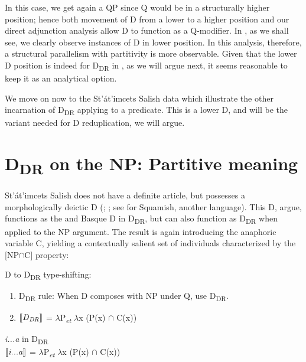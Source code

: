 \documentclass[output=paper,
modfonts
]{langscibook}
\begin{document}
In this case, we get again a QP since Q would be in a structurally higher position; hence both movement of D from a lower to a higher position and our direct adjunction analysis allow D to function as a Q-modifier. In , as we shall see, we clearly observe instances of D in lower position. In this analysis, therefore, a structural parallelism with partitivity is more observable. Given that the lower D position is indeed for D\textsubscript{DR} in , as we will argue next, it seems reasonable to keep it as an analytical option.   

We move on now to the St'\'at'imcets Salish data which illustrate the other incarnation of D\textsubscript{DR} applying to a predicate. This is a lower D, and will be the variant needed for  D reduplication, we will argue.

\section{D\textsubscript{DR} on the NP: Partitive meaning} \label{sec:etxeberria:3}

St'\'at'imcets Salish does not have a definite article, but possesses a morphologically deictic D (\citealt{matthewson1998}; \citeyear{matthewson2008}; see \citealt{gillon2006, gillon2009} for Squamish, another  language). This D, \citet{etxeberria-giannakidou2009, etxeberria-giannakidou2014} argue, functions as the  and Basque D in D\textsubscript{DR}, but can also function as D\textsubscript{DR} when applied to the NP argument. The result is again introducing the anaphoric variable C, yielding a contextually salient set of individuals characterized by the [NP$\cap$C] property:

\ea\label{ex:etxeberria:35}
	D to D\textsubscript{DR} type-shifting:
\begin{enumerate}
	\item D\textsubscript{DR} rule: When D composes with NP under Q, use D\textsubscript{DR}.
	\item $[\![\text{\textit{D}\textsubscript{\textit{DR}}}]\!]$ = $\lambda$P\textsubscript{\textit{et}} $\lambda$x (P(x) $\cap$ C(x))
\end{enumerate}
\z

\ea\label{ex:etxeberria:36}
	\textit{i...a} in D\textsubscript{DR}\\
	$[\![\text{\textit{i...a}}]\!]$ = $\lambda$P\textsubscript{\textit{et}} $\lambda$x (P(x) $\cap$ C(x))
\z
\end{document}
